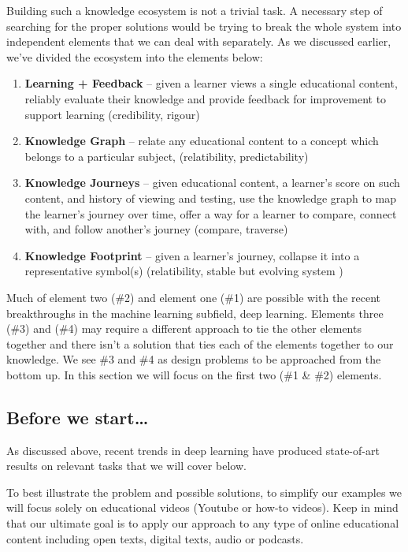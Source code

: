 \documentclass{acm_proc_article-sp}
\begin{document}
Building such a knowledge ecosystem is not a trivial task. A necessary
step of searching for the proper solutions would be trying to break the
whole system into independent elements that we can deal with separately.
As we discussed earlier, we've divided the ecosystem into the elements
below:

\begin{enumerate}
\def\labelenumi{\arabic{enumi}.}
\item
  \textbf{Learning + Feedback} -- given a learner views a single
  educational content, reliably evaluate their knowledge and provide
  feedback for improvement to support learning (credibility, rigour)
\item
  \textbf{Knowledge Graph} -- relate any educational content to a
  concept which belongs to a particular subject, (relatibility,
  predictability)
\item
  \textbf{Knowledge Journeys} -- given educational content, a learner's
  score on such content, and history of viewing and testing, use the
  knowledge graph to map the learner's journey over time, offer a way
  for a learner to compare, connect with, and follow another's journey
  (compare, traverse)
\item
  \textbf{Knowledge Footprint} -- given a learner's journey, collapse it
  into a representative symbol(s) (relatibility, stable but evolving
  system )
\end{enumerate}

Much of element two (\#2) and element one (\#1) are possible with the
recent breakthroughs in the machine learning subfield, deep learning.
Elements three (\#3) and (\#4) may require a different approach to tie
the other elements together and there isn't a solution that ties each of
the elements together to our knowledge. We see \#3 and \#4 as design
problems to be approached from the bottom up. In this section we will
focus on the first two (\#1 \& \#2) elements.

\subsection{Before we start\ldots{}}\label{before-we-start}

As discussed above, recent trends in deep learning have produced
state-of-art results on relevant tasks that we will cover below.

To best illustrate the problem and possible solutions, to simplify our
examples we will focus solely on educational videos (Youtube or how-to
videos). Keep in mind that our ultimate goal is to apply our approach to
any type of online educational content including open texts, digital
texts, audio or podcasts.
\end{document}
